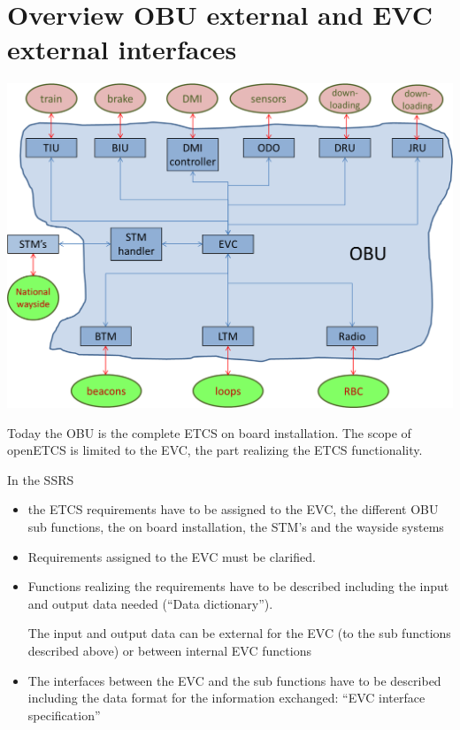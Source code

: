 \documentclass{template/openetcs_article}
\begin{document}
\tableofcontents

\section{Overview OBU external and EVC external interfaces}



\begin{center}
\includegraphics[scale=0.6]{figs/overview_obu}
\end{center}

Today the OBU is the complete ETCS on board installation. The scope of openETCS is limited to the EVC, the part realizing the ETCS functionality.

In the SSRS 
\begin{itemize}
\item the ETCS requirements have to be assigned to the EVC, the different OBU sub functions, the on board installation, the STM's and the wayside systems
\item Requirements assigned to the EVC must be clarified.
\item Functions realizing the requirements have to be described including the input and output data needed ({\textquotedblleft}Data dictionary{\textquotedblright}).

The input and output data can be external for the EVC (to the sub functions described above) or between internal EVC functions 
\item The interfaces between the EVC and the sub functions have to be described including the data format for the information exchanged: {\textquotedblleft}EVC interface specification{\textquotedblright}
\end{itemize}
\end{document}
